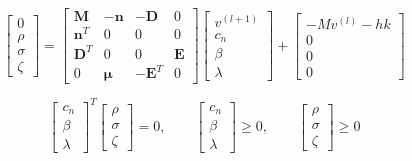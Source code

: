 \documentclass[a4paper,10pt]{article}
\begin{document}
\begin{equation}
\left[ \begin{array}{c}
0 \\
\rho \\
\sigma \\
\zeta
\end{array}  \right]
=
\left[ \begin{array}{cccc}
\mathbf{M} & -\mathbf{n}   & -\mathbf{D}   & 0 \\
\mathbf{n}^T        & 0    & 0    & 0 \\
\mathbf{D}^T        & 0    & 0    & \mathbf{E} \\
0          & \boldsymbol{\mu}  & -\mathbf{E}^T & 0
\end{array}  \right]
\left[ \begin{array}{c}
v^{(l+1)} \\
c_n \\
\beta \\
\lambda
\end{array}  \right]
+
\left[ \begin{array}{c}
-Mv^{(l)}-hk \\
0 \\
0 \\
0
\end{array}  \right]
\end{equation}

\begin{equation}
\left[ \begin{array}{c}
c_n \\
\beta \\
\lambda
\end{array}  \right] ^T
\left[ \begin{array}{c}
\rho \\
\sigma \\
\zeta
\end{array}  \right]
= 0,\quad\quad
\left[ \begin{array}{c}
c_n \\
\beta \\
\lambda
\end{array}  \right]
\geq 0,\quad\quad
\left[ \begin{array}{c}
\rho \\
\sigma \\
\zeta
\end{array}  \right]
\geq 0
\end{equation}
\end{document}
